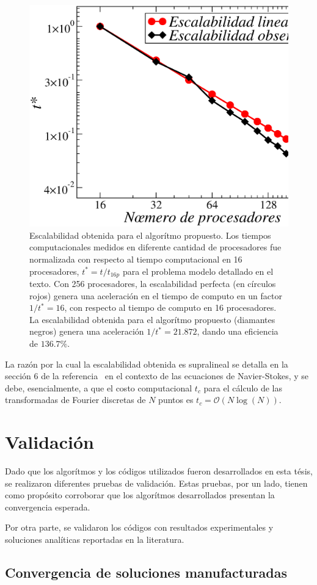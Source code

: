 \begin{figure}[h!]
\centering
  \includegraphics[width=0.5\linewidth]{figuras/escalabilidad.eps}
  \caption{Escalabilidad obtenida para el algorítmo propuesto. 
  Los tiempos computacionales medidos en diferente cantidad 
  de procesadores fue normalizada con respecto al tiempo computacional 
  en 16 procesadores, $t^*=t/t_{16p}$ para 
  el problema modelo detallado en el texto. 
  Con 256 procesadores, la escalabilidad perfecta (en círculos rojos) 
  genera una aceleración en el tiempo de computo en un factor $1/t^*=16$, 
  con respecto al tiempo de computo en 16 procesadores. 
  La escalabilidad obtenida para el algorítmo propuesto 
  (diamantes negros) genera una aceleración $1/t^*=21.872$, dando 
 una eficiencia de $136.7\%$. 
}
 \label{fig:scala}
\end{figure}

La razón por la cual la escalabilidad obtenida es supralineal se detalla 
en la sección 6 de la referencia~\cite{Albin2011} en el contexto de las ecuaciones de 
Navier-Stokes, y se debe, esencialmente, a que el costo 
computacional $t_c$ para el cálculo de las transformadas de Fourier discretas de $N$ puntos es $t_c=\mathcal{O}(N\log(N))$.

\section{Validación}

Dado que los algorítmos y los códigos utilizados fueron desarrollados en 
esta tésis, se realizaron diferentes pruebas de validación. Estas pruebas, 
por un lado, tienen como propósito corroborar que los algorítmos 
desarrollados presentan la convergencia esperada. 

Por otra parte, se validaron los códigos con resultados experimentales 
y soluciones analíticas reportadas en la literatura.

\subsection{Convergencia de soluciones manufacturadas}
\label{sec:manufacturada}

